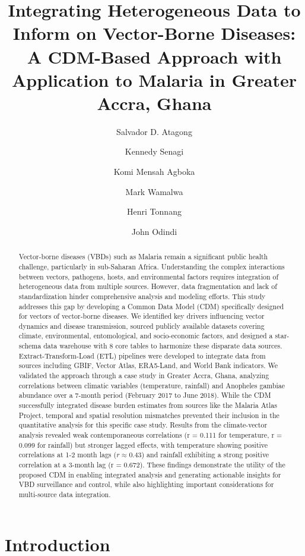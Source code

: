 \documentclass{article}
\title{Integrating Heterogeneous Data to Inform on Vector-Borne Diseases: A CDM-Based Approach with Application 
to Malaria in Greater Accra, Ghana}
\author[1,2]{Salvador D. Atagong}
\author[1]{Kennedy Senagi}
\author[1]{Komi Mensah Agboka}
\author[4]{Mark Wamalwa}
\author[2,3]{Henri Tonnang}
\author[2]{John Odindi}
\affil[1]{International Center of Insect Physiology and Ecology (ICIPE)}
\affil[2]{University of KwaZulu-Natal, South Africa}
\affil[3]{International Institute of Tropical Agriculture (IITA), Ibadan, Nigeria}
\affil[4]{University of Nairobi, Kenya}
\date{}
\begin{document}
\maketitle

\begin{abstract}
Vector-borne diseases (VBDs) such as Malaria remain a significant public health challenge, particularly in sub-Saharan 
Africa. Understanding the complex interactions between vectors, pathogens, hosts, and environmental factors requires 
integration of heterogeneous data from multiple sources. However, data fragmentation and lack of standardization hinder 
comprehensive analysis and modeling efforts. This study addresses this gap by developing a Common Data Model (CDM) 
specifically designed for vectors of vector-borne diseases. We identified key drivers influencing vector dynamics and 
disease transmission, sourced publicly available datasets covering climate, environmental, entomological, and socio-economic 
factors, and designed a star-schema data warehouse with 8 core tables to harmonize these disparate data sources. 
Extract-Transform-Load (ETL) pipelines were developed to integrate data from sources including GBIF, Vector Atlas, 
ERA5-Land, and World Bank indicators. We validated the approach through a case study in Greater Accra, Ghana, analyzing 
correlations between climatic variables (temperature, rainfall) and Anopheles gambiae abundance over a 7-month period 
(February 2017 to June 2018). While the CDM successfully integrated disease burden estimates from sources like the Malaria 
Atlas Project, temporal and spatial resolution mismatches prevented their inclusion in the quantitative analysis for this 
specific case study. Results from the climate-vector analysis revealed weak contemporaneous correlations (r = 0.111 for 
temperature, r = 0.099 for rainfall) but stronger lagged effects, with temperature showing positive correlations at 1-2 
month lags ($r \approx 0.43$) and rainfall exhibiting a strong positive correlation at a 3-month lag (r = 0.672). These 
findings demonstrate the utility of the proposed CDM in enabling integrated analysis and generating actionable insights 
for VBD surveillance and control, while also highlighting important considerations for multi-source data integration.
\end{abstract}

\section{Introduction}
\label{sec:intro}
\end{document}
